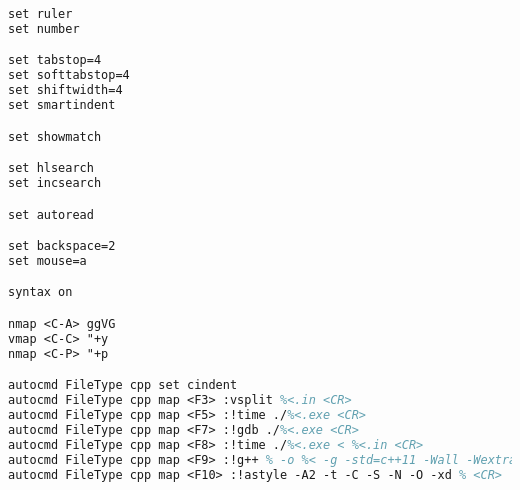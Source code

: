\begin{lstlisting}[language=tex,identifierstyle=\color{black},commentstyle=\color{black}]
set ruler
set number

set tabstop=4
set softtabstop=4
set shiftwidth=4
set smartindent

set showmatch

set hlsearch
set incsearch

set autoread

set backspace=2
set mouse=a

syntax on

nmap <C-A> ggVG
vmap <C-C> "+y
nmap <C-P> "+p

autocmd FileType cpp set cindent
autocmd FileType cpp map <F3> :vsplit %<.in <CR>
autocmd FileType cpp map <F5> :!time ./%<.exe <CR>
autocmd FileType cpp map <F7> :!gdb ./%<.exe <CR>
autocmd FileType cpp map <F8> :!time ./%<.exe < %<.in <CR>
autocmd FileType cpp map <F9> :!g++ % -o %< -g -std=c++11 -Wall -Wextra -Wconversion && size %<.exe <CR>
autocmd FileType cpp map <F10> :!astyle -A2 -t -C -S -N -O -xd % <CR>
\end{lstlisting}
